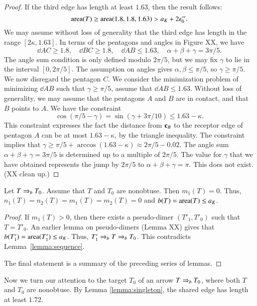 \begin{proof}  If the third edge has length at least $1.63$, then the result follows:
\[
{\operatorname{area}}(T) \ge {\operatorname{area}}(1.8,1.8,1.63) > a_K + 2\epsilon_0''.
\]
We may assume without loss of generality that the third edge has length in the range $[2\kappa,1.63]$.
In terms of the pentagons and angles in Figure XX, we have
\[
\dd{A}{C}\ge 1.8,\quad \dd{B}{C}\ge 1.8,\quad \dd{A}{B}\le 1.63,\quad \alpha+\beta+\gamma=3\pi/5.
\]
The angle sum condition is only defined modulo $2\pi/5$, but we may fix $\gamma$ to lie in the
interval $[0,2\pi/5]$.
The assumption on angles gives $\alpha,\beta\le \pi/5$, so $\gamma\ge \pi/5$.
We now disregard the pentagon $C$.  We consider the minimization problem of minimizing $\dd{A}{B}$ such that
$\gamma\ge\pi/5$, assume that $\dd{A}{B}\le 1.63$.  Without loss of generality, we may assume that the
pentagons $A$ and $B$ are in contact, and that $B$ points to $A$.
We have the constraint
\[
\cos(\pi/5 - \gamma) =\sin(\gamma+3\pi/10) \le 1.63 - \kappa.
\]
This constraint expresses the fact the distance from ${\mathbf c}_B$ to the  receptor edge of pentagon $A$  can be at
most $1.63-\kappa$, by the triangle inequality.  The constraint implies that
$\gamma \ge \pi/5 + \arccos (1.63-\kappa) \approx 2\pi/5 - 0.02$.
The angle sum $\alpha+\beta+\gamma=3\pi/5$ is determined up to a multiple of $2\pi/5$.  The value
for $\gamma$ that we have obtained represents the jump by $2\pi/5$ to $\alpha+\beta+\gamma=\pi$.
This does not exist. (XX clean up.)
\end{proof}

\begin{lemma}\label{lemma:m2-acute} Let $T\Rightarrow_{b} T_0$. Assume that $T$ and $T_0$ are nonobtuse.
Then $m_1(T)=0$.  Thus, $n_1(T)=n_2(T)=m_1(T)=m_2(T)=0$ and $b(T)={\operatorname{area}}(T)\le a_K$.
\end{lemma}

\begin{proof}
If $m_1(T)>0$, then there exists a pseudo-dimer $(T'_1,T'_0)$ such that $T=T'_0$.
An earlier lemma on pseudo-dimers (Lemma XX) gives that $b(T'_1)={\operatorname{area}}(T'_1)\le a_K$.
Thus, $T'_1\Rightarrow_{b} T\Rightarrow_{b} T_0$.  This contradicts Lemma~\ref{lemma:sequence}.

The final statement is a summary of the preceding series of lemmas.
\end{proof}

Now we turn our attention to the target $T_0$ of an arrow $T\Rightarrow_{b} T_0$, where both
$T$ and $T_0$ are nonobtuse.  By Lemma \ref{lemma:singleton}, the shared edge
has length at least $1.72$.


